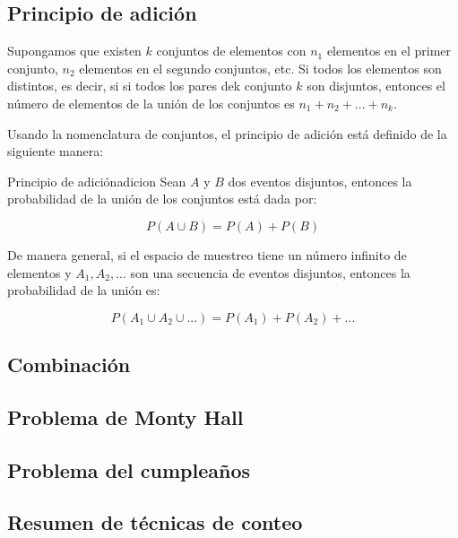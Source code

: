 \subsection{Principio de adición}

Supongamos que existen $k$ conjuntos de elementos con $n_1$ elementos en el
primer conjunto, $n_2$ elementos en el segundo conjuntos, etc. Si todos los
elementos son distintos, es decir, si si todos los pares dek conjunto $k$ son
disjuntos, entonces el número de elementos de la unión de los conjuntos es $n_1
+ n_2 + ... + n_k $.

Usando la nomenclatura de conjuntos, el principio de adición está definido de la
siguiente manera:

\begin{theorem}{Principio de adición}{adicion}
Sean $A$ y $B$ dos eventos disjuntos, entonces la probabilidad de la unión de
los conjuntos está dada por:

\begin{equation}
	P(A \cup B) = P(A) + P(B)
\end{equation}

De manera general, si el espacio de muestreo tiene un número infinito de
elementos y $A_1, A_2, ... $ son una secuencia de eventos disjuntos, entonces la
probabilidad de la unión es:

\begin{equation}
	P(A_1 \cup A_2 \cup ...) = P(A_1) + P(A_2) + ...
\end{equation}

\end{theorem}





\subsection{Combinación}

\subsection{Problema de Monty Hall}

\subsection{Problema del cumpleaños}

\subsection{Resumen de técnicas de conteo}

